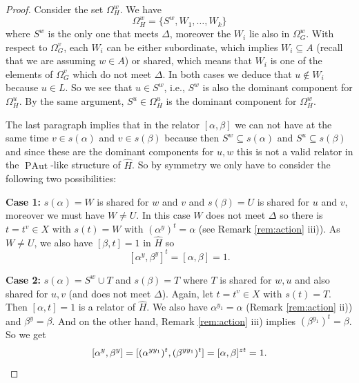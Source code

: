 \documentclass[10pt]{amsart}
\theoremstyle{definition}
\newcommand{\PAut}{\operatorname{PAut}}
\theoremstyle{definition}
\numberwithin{equation}{section}
\begin{document}
\begin{proof}
Consider the set $\Omega_H^w$. We have
\[\Omega_H^w=\{S^w,W_1,\ldots,W_k\}\]
where $S^w$ is the only one that meets $\Delta$, moreover the $W_i$ lie also in $\Omega_G^w$. With respect to $\Omega_G^v$, each $W_i$ can be either subordinate, which implies $W_i\subseteq A$ (recall that we are assuming $w\in A$) or shared, which means that $W_i$ is one of the elements of $\Omega_G^v$ which do not meet $\Delta$. In both cases we deduce that $u\not\in W_i$ because $u\in L$. So we see that $u\in S^w$, i.e., $S^w$ is also the dominant component for $\Omega_H^u$. By the same argument, $S^u\in\Omega_H^u$ is the dominant component for $\Omega_H^w$.

The last paragraph implies that in the relator $[\alpha,\beta]$ we can not have at the same time $v\in s(\alpha)$ and $v\in s(\beta)$ because then $S^w\subseteq s(\alpha)$ and $S^u\subseteq s(\beta)$ and since these are the dominant components for $u,w$ this is not a valid relator in the $\PAut$-like structure of $\hat H$. So by symmetry we only have to consider the following two possibilities:

\textbf{Case 1:} $s(\alpha)=W$ is shared for $w$ and $v$ and $s(\beta)=U$ is shared for $u$ and $v$, moreover we must have $W\neq U$. In this case $W$ does not meet $\Delta$ so there is $t=t^v\in X$ with $s(t)=W$ with $(\alpha^y)^t=\alpha$ (see Remark \ref{rem:action} iii)). As $W\neq U$, we also have $[\beta,t]=1$ in $\hat H$ so
\[[\alpha^y,\beta^y]^t=[\alpha,\beta]=1.\]


\textbf{Case 2:} $s(\alpha)=S^w\cup T$ and $s(\beta)=T$ where $T$ is shared for $w,u$ and also shared for $u,v$ (and does not meet $\Delta$). Again, let $t=t^v\in X$ with $s(t)=T$. Then $[\alpha,t]=1$ is a relator of $\hat H$. We also have $\alpha^{y_1}=\alpha$ (Remark \ref{rem:action} ii)) and $\beta^y=\beta$. And on the other hand, Remark \ref{rem:action} iii) implies $(\beta^{y_1})^t=\beta$. So we get
\[[\alpha^y,\beta^y]=[(\alpha^{yy_1})^t,(\beta^{yy_1})^t]=[\alpha,\beta]^{zt}=1.\qedhere \]
\end{proof}
\end{document}

